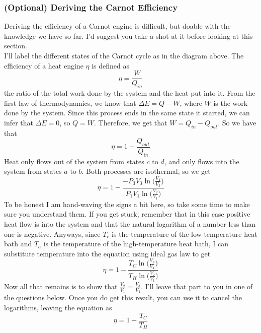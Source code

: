 \subsubsection{(Optional) Deriving the Carnot Efficiency}
Deriving the efficiency of a Carnot engine is difficult, but doable with the knowledge we have so far. I'd suggest you take a shot at it before looking at this section. \\
I'll label the different states of the Carnot cycle as in the diagram above. The efficiency of a heat engine $\eta$ is defined as
\begin{equation*}
    \eta = \frac{W}{Q_{in}}
\end{equation*}
the ratio of the total work done by the system and the heat put into it. From the first law of thermodynamics, we know that $\Delta E = Q - W$, where $W$ is the work done by the system. Since this process ends in the same state it started, we can infer that $\Delta E = 0$, so $Q = W$. Therefore, we get that $W = Q_{in} - Q_{out}$. So we have that
\begin{equation*}
    \eta = 1 - \frac{Q_{out}}{Q_{in}}
\end{equation*}
Heat only flows out of the system from states $c$ to $d$, and only flows into the system from states $a$ to $b$. Both processes are isothermal, so we get
\begin{equation*}
    \eta = 1 - \frac{-P_{3}V_{3}\ln{\Big(\frac{V_4}{V_3}\Big)}}{P_{1}V_{1}\ln{\Big(\frac{V_2}{V_1}\Big)}}
\end{equation*}
To be honest I am hand-waving the signs a bit here, so take some time to make sure you understand them. If you get stuck, remember that in this case positive heat flow is into the system and that the natural logarithm of a number less than one is negative. Anyways, since $T_c$ is the temperature of the low-temperature heat bath and $T_a$ is the temperature of the high-temperature heat bath, I can substitute temperature into the equation using ideal gas law to get
\begin{equation*}
    \eta = 1 - \frac{T_{C}\ln{\Big(\frac{V_3}{V_4}\Big)}}{T_{H}\ln{\Big(\frac{V_2}{V_1}\Big)}}
\end{equation*}
Now all that remains is to show that $\frac{V_2}{V_1} = \frac{V_3}{V_4}$. I'll leave that part to you in one of the questions below. Once you do get this result, you can use it to cancel the logarithms, leaving the equation as
\begin{equation*}
    \eta = 1 - \frac{T_C}{T_H}
\end{equation*}